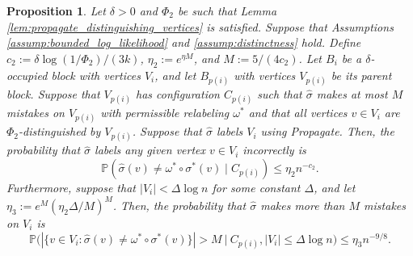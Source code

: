 \documentclass{article}
\renewcommand{\P}{\mathbb{P}}
\newcommand{\1}{\mathbbm{1}}
\theoremstyle{definition}
\theoremstyle{plain}
\newtheorem{prop}{Proposition}
\begin{document}
\begin{prop}
\label{prop:propagation_error_block}
Let $\delta > 0$ and $\Phi_2$ be such that Lemma \ref{lem:propagate_distinguishing_vertices} is satisfied. Suppose that Assumptions \ref{assump:bounded_log_likelihood} and \ref{assump:distinctness} hold. Define $c_2 := \delta \log(1/\Phi_2) / (3k)$, $\eta_2 := e^{\eta M}$, and $M := 5/(4c_2)$. Let $B_i$ be a $\delta$-occupied block with vertices $V_i$, and let $B_{p(i)}$ with vertices $V_{p(i)}$ be its parent block. Suppose that $V_{p(i)}$ has configuration $C_{p(i)}$ such that $\hat{\sigma}$ makes at most $M$ mistakes on $V_{p(i)}$ with permissible relabeling $\omega^*$ and that all vertices $v \in V_i$ are $\Phi_2$-distinguished by $V_{p(i)}$. Suppose that $\hat{\sigma}$ labels $V_i$ using Propagate. Then, the probability that $\hat{\sigma}$ labels any given vertex $v \in V_i$ incorrectly is
\begin{equation*}
    \P(\hat{\sigma}(v) \neq \omega^* \circ \sigma^*(v) \mid C_{p(i)}) \leq \eta_2 n^{-c_2}.
\end{equation*}
Furthermore, suppose that $|V_i| < \Delta \log n$ for some constant $\Delta$, and let $\eta_3 := e^M(\eta_2 \Delta / M)^M$. Then, the probability that $\hat{\sigma}$ makes more than $M$ mistakes on $V_i$ is
\begin{equation*}
    \P\bigg( | \{v \in V_i: \hat{\sigma}(v) \neq \omega^* \circ \sigma^*(v)\} | > M \: \Big| \: C_{p(i)}, |V_i| \leq \Delta \log n \bigg) \leq \eta_3 n^{-9/8}.
\end{equation*} 
\end{prop}
\end{document}
